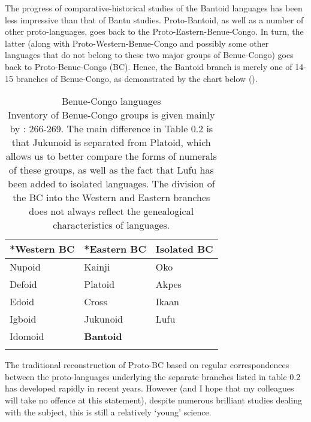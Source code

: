 The progress of comparative-historical studies of the Bantoid languages has been less impressive than that of Bantu studies. Proto-Bantoid, as well as a number of other proto-languages, goes back to the Proto-Eastern-Benue-Congo. In turn, the latter (along with Proto-Western-Benue-Congo and possibly some other languages that do not belong to these two major groups of Benue-Congo) goes back to Proto-Benue-Congo (BC). Hence, the Bantoid branch is merely one of 14-15 branches of Benue-Congo, as demonstrated by the chart below ().

 
\begin{table}
\caption{Benue-Congo languages\\
{Inventory of Benue-Congo groups is given mainly by \citealt{Williamson1989b}: 266-269. The main difference in Table 0.2 is that Jukunoid is separated from Platoid, which allows us to better compare the forms of numerals of these groups, as well as the fact that Lufu has been added to isolated languages. The division of the BC into the Western and Eastern branches does not always reflect the genealogical characteristics of languages.}}
\label{tab:0.2}
\begin{tabularx}{\textwidth}{XXX}
\lsptoprule
\cellcolor{green}*Western BC &\cellcolor{yellow} *Eastern BC & Isolated BC\\
\midrule 
\cellcolor{green}Nupoid &\cellcolor{yellow} Kainji & Oko\index{Oko!}\\
\cellcolor{green}Defoid &\cellcolor{yellow} Platoid & Akpes\index{Akpes!} \\
\cellcolor{green}Edoid &\cellcolor{yellow} Cross & Ikaan\index{Ikaan!}\\
\cellcolor{green}Igboid &\cellcolor{yellow} Jukunoid & Lufu\index{Lufu!}\\
\cellcolor{green}Idomoid &\cellcolor{yellow} \textbf{Bantoid} & \\
\lspbottomrule
\end{tabularx}
\end{table}

The traditional reconstruction of Proto-BC based on regular correspondences between the proto-languages underlying the separate branches listed in table 0.2 has developed rapidly in recent years. However (and I hope that my colleagues will take no offence at this statement), despite numerous brilliant studies dealing with the subject, this is still a relatively ‘young’ science.

